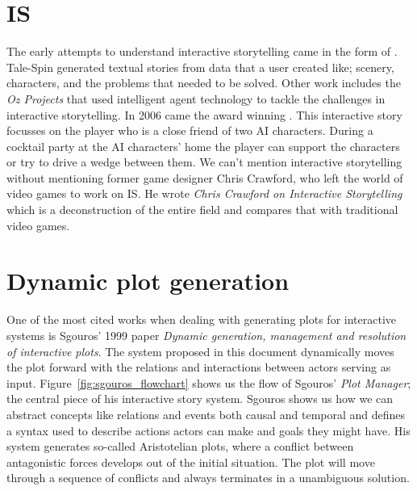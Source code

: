 \section{IS}
The early attempts to understand interactive storytelling came in the form of \cite{Meehan77talespin}. Tale-Spin generated textual stories from data that a user created like; scenery, characters, and the problems that needed to be solved. Other work includes the \textit{Oz Projects}\cite{Mateas97anozcentric} that used intelligent agent technology to tackle the challenges in interactive storytelling. In 2006 came the award winning \citep{Mateas03facade:an}. This interactive story focusses on the player who is a close friend of two AI characters. During a cocktail party at the AI characters' home the player can support the characters or try to drive a wedge between them. We can't mention interactive storytelling without mentioning former game designer Chris Crawford, who left the world of video games to work on IS. He wrote \textit{Chris Crawford on Interactive Storytelling}\cite{crawford2012chris} which is a deconstruction of the entire field and compares that with traditional video games. 


\section{Dynamic plot generation}
One of the most cited works when dealing with generating plots for interactive systems is Sgouros' 1999 paper \textit{Dynamic generation, management and resolution of interactive plots}\cite{Sgouros199929}. The system proposed in this document dynamically moves the plot forward with the relations and interactions between actors serving as input. Figure~\ref{fig:sgouros_flowchart} shows us the flow of Sgouros' \textit{Plot Manager}; the central piece of his interactive story system. Sgouros shows us how we can abstract concepts like relations and events both causal and temporal and defines a syntax used to describe actions actors can make and goals they might have. His system generates so-called Aristotelian plots, where a conflict between antagonistic forces develops out of the initial situation. The plot will move through a sequence of conflicts and always terminates in a unambiguous solution. 

